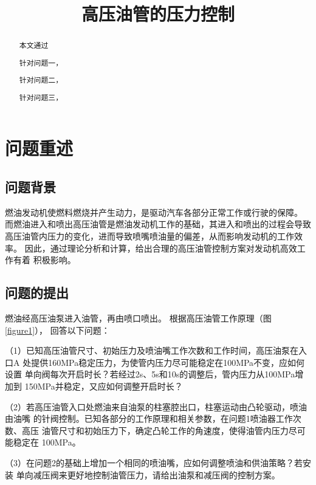 \documentclass[withoutpreface,bwprint]{cumcmthesis} %
\title{高压油管的压力控制}
\begin{document}
\maketitle
\begin{abstract}
        本文通过

        针对问题一，
        
        针对问题二，
        
        针对问题三，
        
        
\end{abstract}



\section{问题重述}
\subsection{问题背景}
        燃油发动机使燃料燃烧并产生动力，是驱动汽车各部分正常工作或行驶的保障。                      
    而燃油进入和喷出高压油管是燃油发动机工作的基础，其进入和喷出的过程会导致
    高压油管内压力的变化，进而导致喷嘴喷油量的偏差，从而影响发动机的工作效率。
    因此，通过理论分析和计算，给出合理的高压油管控制方案对发动机高效工作有着
    积极影响。

\subsection{问题的提出}
        燃油经高压油泵进入油管，再由喷口喷出。
    根据高压油管工作原理（图\ref{figure1}），
    回答以下问题：

（1）已知高压油管尺寸、初始压力及喷油嘴工作次数和工作时间，高压油泵在入口A
    处提供160MPa稳定压力，为使管内压力尽可能稳定在100MPa不变，应如何设置
    单向阀每次开启时长？若经过2s、5s和10s的调整后，管内压力从100MPa增加到
    150MPa并稳定，又应如何调整开启时长？

（2）若高压油管入口处燃油来自油泵的柱塞腔出口，柱塞运动由凸轮驱动，喷油由油嘴
    的针阀控制。已知各部分的工作原理和相关参数，在问题1喷油器工作次数、高压
    油管尺寸和初始压力下，确定凸轮工作的角速度，使得油管内压力尽可能稳定在
    100MPa。

（3）在问题2的基础上增加一个相同的喷油嘴，应如何调整喷油和供油策略？若安装
    单向减压阀来更好地控制油管压力，请给出油泵和减压阀的控制方案。
\end{document}
